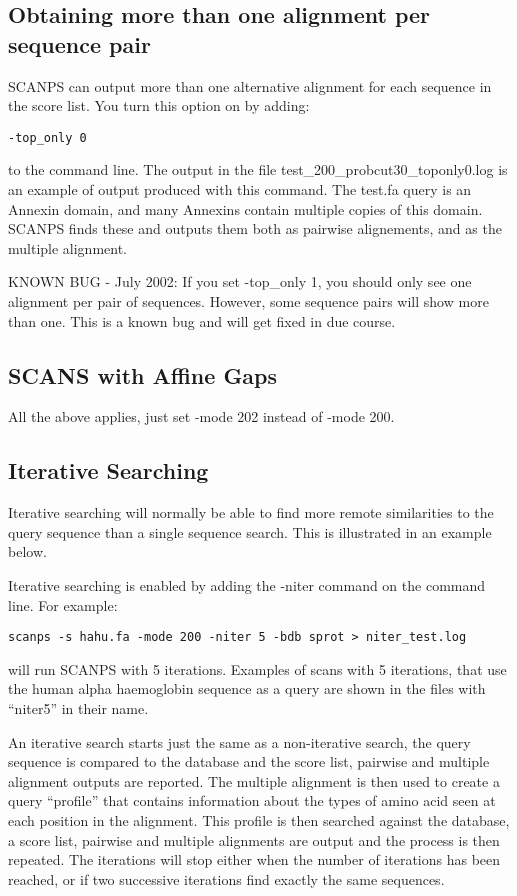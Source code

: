 \documentclass[12pt]{article}
\begin{document}
\subsection{Obtaining more than one alignment per sequence pair}

SCANPS can output more than one alternative alignment for each
sequence in the score list.  You turn this option on by adding:

\begin{verbatim}
-top_only 0
\end{verbatim}
to the command line.  The output in the file
test\_200\_probcut30\_toponly0.log is an example of output produced
with this command.  The test.fa query is an Annexin domain, and many
Annexins contain multiple copies of this domain.  SCANPS finds these
and outputs them both as pairwise alignements, and as the multiple
alignment.

KNOWN BUG - July 2002: If you set -top\_only 1, you should only see one
alignment per pair of sequences.  However, some sequence pairs will
show more than one.  This is a known bug and will get fixed in due
course.

\subsection{SCANS with Affine Gaps}

All the above applies, just set -mode 202 instead of -mode 200.

\subsection{Iterative Searching}

Iterative searching will normally be able to find more remote
similarities to the query sequence than a single sequence search.
This is illustrated in an example below.

Iterative searching is enabled by adding the -niter command on the
command line.  For example:

\begin{verbatim}
scanps -s hahu.fa -mode 200 -niter 5 -bdb sprot > niter_test.log
\end{verbatim}

will run SCANPS with 5 iterations.  Examples of scans with 5
iterations, that use the human alpha haemoglobin sequence as a query
are shown in the files with ``niter5'' in their name.

An iterative search starts just the same as a non-iterative search,
the query sequence is compared to the database and the score list,
pairwise and multiple alignment outputs are reported.  The multiple
alignment is then used to create a query ``profile'' that contains
information about the types of amino acid seen at each position in the
alignment.  This profile is then searched against the database, a score
list, pairwise and multiple alignments are output and the process is
then repeated.  The iterations will stop either when the number of
iterations has been reached, or if two successive iterations find
exactly the same sequences.
\end{document}
